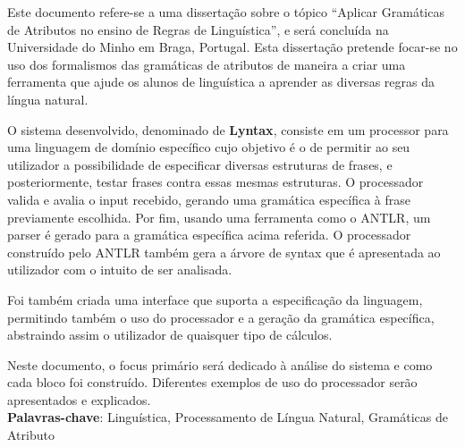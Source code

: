 Este documento refere-se a uma dissertação sobre o tópico ``Aplicar Gramáticas de Atributos no ensino de Regras de Linguística'', 
e será concluída na Universidade do Minho em Braga, Portugal.
Esta dissertação pretende focar-se no uso dos formalismos das gramáticas de atributos de maneira a criar uma ferramenta que ajude os alunos de linguística a aprender 
as diversas regras da língua natural.

O sistema desenvolvido, denominado de \textbf{Lyntax}, consiste em um processor para uma linguagem de domínio específico cujo objetivo é o de permitir ao seu utilizador
a possibilidade de especificar diversas estruturas de frases, e posteriormente, testar frases contra essas mesmas estruturas.
O processador valida e avalia o input recebido, gerando uma gramática específica à frase previamente escolhida.
Por fim, usando uma ferramenta como o \textsc{ANTLR}, um parser é gerado para a gramática específica acima referida. O processador construído pelo \textsc{ANTLR} também gera a árvore de syntax que é apresentada ao utilizador com o intuito de ser analisada.

Foi também criada uma interface que suporta a especificação da linguagem, permitindo também o uso do processador e a geração da gramática específica,
abstraindo assim o utilizador de quaisquer tipo de cálculos.

Neste documento, o focus primário será dedicado à análise do sistema e como cada bloco foi construído.
Diferentes exemplos de uso do processador serão apresentados e explicados.\\[0.1cm]

    
\noindent \textbf{Palavras-chave}: Linguística, Processamento de Língua Natural, Gramáticas de Atributo